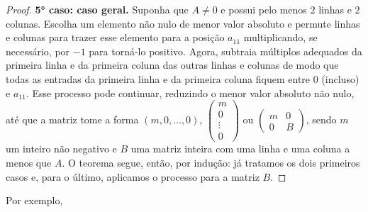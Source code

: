 \begin{proof}
    		\par\textbf{5° caso: caso geral.} Suponha que $A\neq0$ e possui pelo menos $2$ linhas e $2$ colunas.
    		Escolha um elemento não nulo de menor valor absoluto e permute linhas e colunas para trazer esse
    		elemento para a posição $a_{11}$ multiplicando, se necessário, por $-1$ para torná-lo positivo. 
    		Agora, subtraia múltiplos adequados da primeira linha e da primeira coluna das outras linhas e 
    		colunas de modo que todas as entradas da primeira linha e da primeira coluna fiquem entre 
    		$0$ (incluso) e $a_{11}$. Esse processo pode continuar, reduzindo o menor valor absoluto não nulo, 
    		até que a matriz tome a forma $(m,0,\dots,0)$, 
    		$\begin{pmatrix}
    		m\\
    		0\\
    		\vdots\\
    		0
    		\end{pmatrix}$ ou $\begin{pmatrix}
    		m & 0 \\
    		0 & B
    		\end{pmatrix}$, sendo $m$ um inteiro não negativo e $B$ uma matriz inteira com uma linha e uma 
    		coluna a menos que $A$. O teorema segue, então, por indução: já tratamos os dois primeiros casos e,
    		para o último, aplicamos o processo para a matriz $B$.  
    	\end{proof}
    	Por exemplo,
